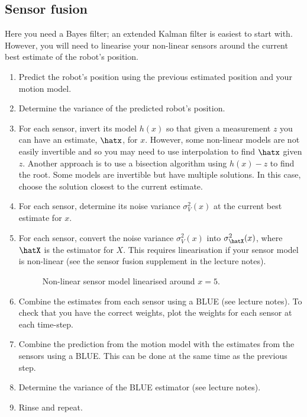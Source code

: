 \documentclass[a4paper, 12]{article}
\newcommand{\est}[1]{\expandafter\hat#1}
\newcommand{\var}[1]{\sigma_{#1}^2}
\begin{document}
\subsection{Sensor fusion}


Here you need a Bayes filter; an extended Kalman filter is easiest to
start with.  However, you will need to linearise your non-linear
sensors around the current best estimate of the robot's position.

\begin{enumerate}
\item Predict the robot's position using the previous estimated
  position and your motion model.

\item Determine the variance of the predicted robot's position.  
  
\item For each sensor, invert its model $h(x)$ so that given a
  measurement $z$ you can have an estimate, $\est{x}$, for $x$.
  However, some non-linear models are not easily invertible and so you
  may need to use interpolation to find $\est{x}$ given $z$.  Another
  approach is to use a bisection algorithm using $h(x) - z$ to find
  the root.  Some models are invertible but have multiple solutions.
  In this case, choose the solution closest to the current estimate.

\item For each sensor, determine its noise variance $\var{V}(x)$ at
  the current best estimate for $x$.

\item For each sensor, convert the noise variance $\var{V}(x)$ into
  $\var{\est{X}}(x)$, where $\est{X}$ is the estimator for $X$.  This
  requires linearisation if your sensor model is non-linear (see the
  sensor fusion supplement in the lecture notes).

  \begin{figure}[!h]
  \centering
  
  \caption{Non-linear sensor model linearised around $x=5$.}
  \label{fig:linearised}
  \end{figure}
  
\item Combine the estimates from each sensor using a BLUE (see lecture
  notes).  To check that you have the correct weights, plot the
  weights for each sensor at each time-step.

\item Combine the prediction from the motion model with the estimates
  from the sensors using a BLUE.  This can be done at the same time as
  the previous step.

\item Determine the variance of the BLUE estimator (see lecture
  notes).

\item Rinse and repeat.
\end{enumerate}
\end{document}
